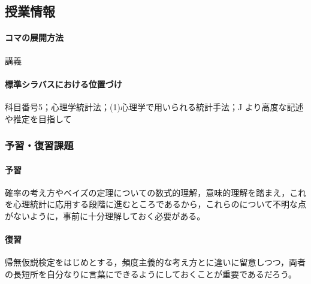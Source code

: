 \subsection{授業情報}
\paragraph{コマの展開方法}
講義
\paragraph{標準シラバスにおける位置づけ}
科目番号5；心理学統計法；(1)心理学で用いられる統計手法；J より高度な記述や推定を目指して
\subsubsection{予習・復習課題}
\paragraph{予習}確率の考え方やベイズの定理についての数式的理解，意味的理解を踏まえ，これを心理統計に応用する段階に進むところであるから，これらのについて不明な点がないように，事前に十分理解しておく必要がある。
\paragraph{復習}帰無仮説検定をはじめとする，頻度主義的な考え方とに違いに留意しつつ，両者の長短所を自分なりに言葉にできるようにしておくことが重要であるだろう。
